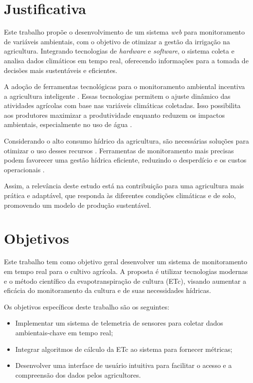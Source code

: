 \section{Justificativa}

Este trabalho propõe o desenvolvimento de um sistema \textit{web} para monitoramento de variáveis ambientais, com o objetivo de otimizar a gestão da irrigação na agricultura. Integrando tecnologias de \textit{hardware} e \textit{software}, o sistema coleta e analisa dados climáticos em tempo real, oferecendo informações para a tomada de decisões mais sustentáveis e eficientes.

A adoção de ferramentas tecnológicas para o monitoramento ambiental incentiva a agricultura inteligente \parencite{Garg_smart2023}. Essas tecnologias permitem o ajuste dinâmico das atividades agrícolas com base nas variáveis climáticas coletadas. Isso possibilita aos produtores maximizar a produtividade enquanto reduzem os impactos ambientais, especialmente no uso de água \parencite{Gurjeet_smart2022}.

Considerando o alto consumo hídrico da agricultura, são necessárias soluções para otimizar o uso desses recursos \parencite{Ramos_irrigacao2022}. Ferramentas de monitoramento mais precisas podem favorecer uma gestão hídrica eficiente, reduzindo o desperdício e os custos operacionais \parencite{carmody_fao2023}.

Assim, a relevância deste estudo está na contribuição para uma agricultura mais prática e adaptável, que responda às diferentes condições climáticas e de solo, promovendo um modelo de produção sustentável.

\section{Objetivos}

Este trabalho tem como objetivo geral desenvolver um sistema de monitoramento em tempo real para o cultivo agrícola. A proposta é utilizar tecnologias modernas e o método científico da evapotranspiração de cultura (ETc), visando aumentar a eficácia do monitoramento da cultura e de suas necessidades hídricas.

Os objetivos específicos deste trabalho são os seguintes:

\begin{itemize}
    \item Implementar um sistema de telemetria de sensores para coletar dados ambientais-chave em tempo real;
    \item Integrar algoritmos de cálculo da ETc ao sistema para fornecer métricas;
    \item Desenvolver uma interface de usuário intuitiva para facilitar o acesso e a compreensão dos dados pelos agricultores.
\end{itemize}

